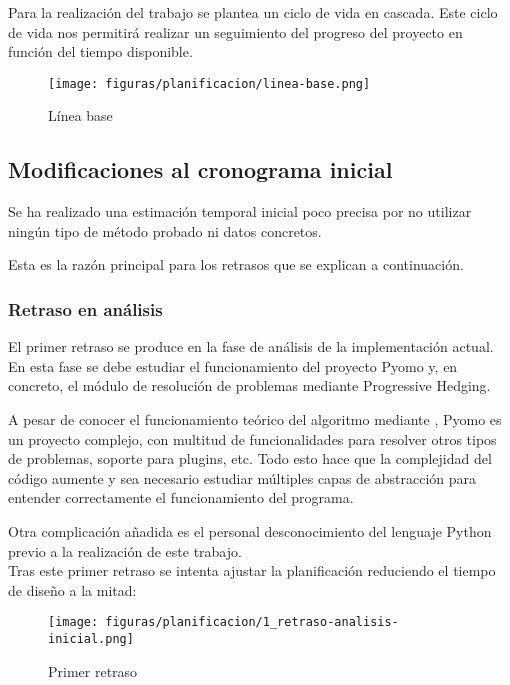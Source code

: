 Para la realización del trabajo se plantea un ciclo de vida en cascada. Este ciclo de vida nos permitirá realizar un seguimiento del progreso del proyecto en función del tiempo disponible.

\begin{figure}[H]
    \centerline{\texttt{[image: figuras/planificacion/linea-base.png]}}
    \caption{Línea base}
\end{figure}

\subsection{Modificaciones al cronograma inicial}
\label{sec:modificacionesCronograma}

Se ha realizado una estimación temporal inicial poco precisa por no utilizar ningún tipo de método probado ni datos concretos.

Esta es la razón principal para los retrasos que se explican a continuación.

\subsubsection{Retraso en análisis}

El primer retraso se produce en la fase de análisis de la implementación actual. En esta fase se debe estudiar el funcionamiento del proyecto Pyomo y, en concreto, el módulo de resolución de problemas mediante Progressive Hedging. 

A pesar de conocer el funcionamiento teórico del algoritmo mediante \cite{TODO}, Pyomo es un proyecto complejo, con multitud de funcionalidades para resolver otros tipos de problemas, soporte para plugins, etc. Todo esto hace que la complejidad del código aumente y sea necesario estudiar múltiples capas de abstracción para entender correctamente el funcionamiento del programa.

Otra complicación añadida es el personal desconocimiento del lenguaje Python previo a la realización de este trabajo.\\

Tras este primer retraso se intenta ajustar la planificación reduciendo el tiempo de diseño a la mitad:

\begin{figure}[H]
    \centerline{\texttt{[image: figuras/planificacion/1\_retraso-analisis-inicial.png]}}
    \caption{Primer retraso}
\end{figure}

